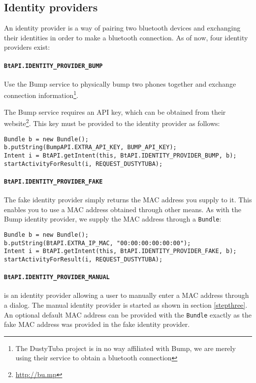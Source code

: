 \documentclass[a4paper,11pt]{article}
\begin{document}
\subsection{Identity providers}
\label{identity-providers}
An identity provider is a way of pairing two bluetooth devices and exchanging their identities in order to make a bluetooth connection. As of now, four identity providers exist:

\paragraph{{\tt BtAPI.IDENTITY\_PROVIDER\_BUMP}}
Use the Bump\texttrademark{} service to physically bump two phones together and exchange connection information\footnote{The DustyTuba project is in no way affiliated with Bump\texttrademark, we are merely using their service to obtain a bluetooth connection}.

The Bump\texttrademark{} service requires an API key, which can be obtained from their website\footnote{\url{http://bu.mp}}. This key must be provided to the identity provider as follows:

\footnotesize
\begin{verbatim}
Bundle b = new Bundle();
b.putString(BumpAPI.EXTRA_API_KEY, BUMP_API_KEY);
Intent i = BtAPI.getIntent(this, BtAPI.IDENTITY_PROVIDER_BUMP, b);
startActivityForResult(i, REQUEST_DUSTYTUBA);
\end{verbatim}
\normalsize

\paragraph{{\tt BtAPI.IDENTITY\_PROVIDER\_FAKE}}
The fake identity provider simply returns the MAC address you supply to it. This enables you to use a MAC address obtained through other means. As with the Bump\texttrademark{} identity provider, we supply the MAC address through a \verb+Bundle+:

\footnotesize
\begin{verbatim}
Bundle b = new Bundle();
b.putString(BtAPI.EXTRA_IP_MAC, "00:00:00:00:00:00");
Intent i = BtAPI.getIntent(this, BtAPI.IDENTITY_PROVIDER_FAKE, b);
startActivityForResult(i, REQUEST_DUSTYTUBA);
\end{verbatim}
\normalsize

\paragraph{{\tt BtAPI.IDENTITY\_PROVIDER\_MANUAL}}
is an identity provider allowing a user to manually enter a MAC address through a dialog. The manual identity provider is started as shown in section \ref{stepthree}. An optional default MAC address can be provided with the \verb+Bundle+ exactly as the fake MAC address was provided in the fake identity provider.
\end{document}
